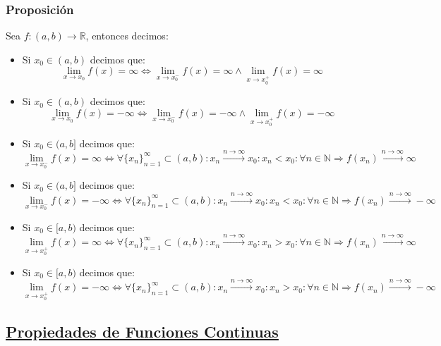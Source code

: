 \documentclass[10pt,a4paper,openright]{book}
\begin{document}
\subsubsection*{Proposición}
Sea $f: (a,b)\longrightarrow \mathbb R$, entonces decimos:
\begin{itemize}
\item Si $x_0\in (a,b)$ decimos que:
$$\lim_{x\rightarrow x_0}f(x)=\infty\Leftrightarrow \lim_{x\rightarrow x_0^-}f(x)=\infty \wedge \lim_{x\rightarrow x_0^+}f(x)=\infty$$

\item Si $x_0\in (a,b)$ decimos que:
$$\lim_{x\rightarrow x_0}f(x)=-\infty\Leftrightarrow \lim_{x\rightarrow x_0^-}f(x)=-\infty \wedge \lim_{x\rightarrow x_0^+}f(x)=-\infty$$

\item Si $x_0\in (a,b]$ decimos que:
$$\lim_{x\rightarrow x_0^-}f(x)=\infty\Leftrightarrow \forall \{x_n\}_{n=1}^\infty \subset (a,b): x_n\xrightarrow{n\rightarrow\infty} x_0: x_n<x_0: \forall n\in \mathbb N\Rightarrow f(x_n)\xrightarrow{n\rightarrow \infty} \infty$$

\item Si $x_0\in (a,b]$ decimos que:
$$\lim_{x\rightarrow x_0^-}f(x)=-\infty\Leftrightarrow \forall \{x_n\}_{n=1}^\infty \subset (a,b): x_n\xrightarrow{n\rightarrow\infty} x_0: x_n<x_0: \forall n\in \mathbb N\Rightarrow f(x_n)\xrightarrow{n\rightarrow \infty} -\infty$$

\item Si $x_0\in [a,b)$ decimos que:
$$\lim_{x\rightarrow x_0^+}f(x)=\infty\Leftrightarrow \forall \{x_n\}_{n=1}^\infty \subset (a,b): x_n\xrightarrow{n\rightarrow\infty} x_0: x_n>x_0: \forall n\in \mathbb N\Rightarrow f(x_n)\xrightarrow{n\rightarrow \infty} \infty$$

\item Si $x_0\in [a,b)$ decimos que:
$$\lim_{x\rightarrow x_0^+}f(x)=-\infty\Leftrightarrow \forall \{x_n\}_{n=1}^\infty \subset (a,b): x_n\xrightarrow{n\rightarrow\infty} x_0: x_n>x_0: \forall n\in \mathbb N\Rightarrow f(x_n)\xrightarrow{n\rightarrow \infty} -\infty$$
\end{itemize}

\subsection*{\underline{Propiedades de Funciones Continuas}}
\end{document}
